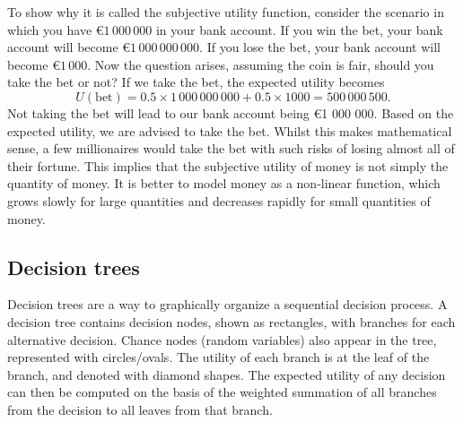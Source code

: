 \documentclass{article}
\begin{document}
\noindent To show why it is called the subjective utility function, consider the scenario in which you have $\euro{1\,000\,000}$ in your bank account. If you win the bet, your bank account will become $\euro{1\,000\,000\,000}$. If you lose the bet, your bank account will become $\euro{1\,000}$. Now the question arises, assuming the coin is fair, should you take the bet or not? If we take the bet, the expected utility becomes
$$
    U(\text{bet}) = 0.5 \times 1\,000\,000\,000 + 0.5 \times 1000 = 500\,000\,500.
$$
Not taking the bet will lead to our bank account being \euro{1 000 000}. Based on the expected utility, we are advised to take the bet. Whilst this makes mathematical sense, a few millionaires would take the bet with such risks of losing almost all of their fortune. This implies that the subjective utility of money is not simply the quantity of money. It is better to model money as a non-linear function, which grows slowly for large quantities and decreases rapidly for small quantities of money.  

\subsection{Decision trees}
Decision trees are a way to graphically organize a sequential decision process. A decision tree contains decision nodes, shown as rectangles, with branches for each alternative decision. Chance nodes (random variables) also appear in the tree, represented with circles/ovals. The utility of each branch is at the leaf of the branch, and denoted with diamond shapes. The expected utility of any decision can then be computed on the basis of the weighted summation of all branches from the decision to all leaves from that branch.  
\end{document}
